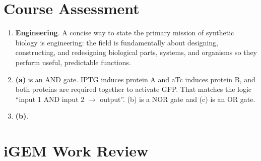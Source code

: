 \documentclass[12pt,a4paper]{article}
\begin{document}
\maketitle

\section{Course Assessment}

\begin{enumerate}[parsep=0.5\baselineskip] 
  \item \textbf{Engineering}. A concise way to state the primary mission of synthetic biology is engineering: the field is fundamentally about designing, constructing, and redesigning biological parts, systems, and organisms so they perform useful, predictable functions.
  \item \textbf{(a)} is an AND gate. IPTG induces protein A and aTc induces protein B, and both proteins are required together to activate GFP. That matches the logic ``input 1 AND input 2 $\to$ output''. (b) is a NOR gate and (c) is an OR gate.
  \item \textbf{(b)}.
\end{enumerate}

\section{iGEM Work Review}
\end{document}
